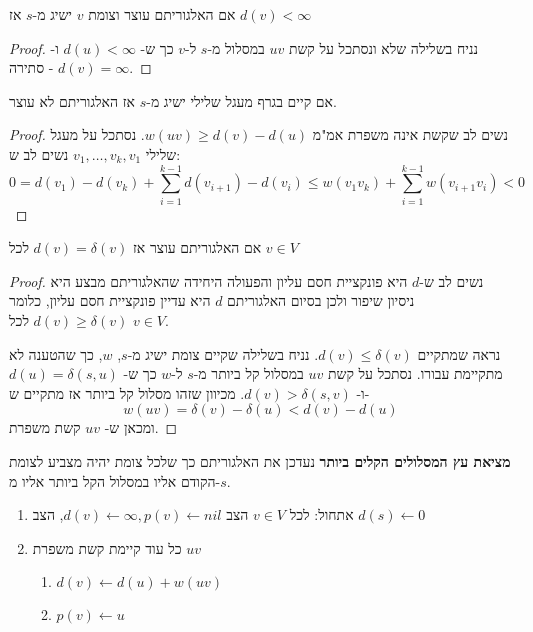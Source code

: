 \begin{claim}
אם האלגוריתם עוצר וצומת $v$ ישיג מ-$s$ אז 
$d(v) < \infty$
\end{claim}
\begin{proof}
נניח בשלילה שלא ונסתכל על קשת
$uv$
במסלול מ-$s$ ל-$v$ כך ש-%
$d(u) < \infty$
ו-%
$d(v) = \infty$
- סתירה.
\end{proof}



\begin{claim}
אם קיים בגרף מעגל שלילי ישיג מ-$s$ אז האלגוריתם לא עוצר.
\end{claim}
\begin{proof}
נשים לב שקשת אינה משפרת אמ"מ 
$w(uv) \geq d(v) - d(u)$.
נסתכל על מעגל שלילי
$v_1, \ldots, v_k, v_1$
נשים לב ש:
$$
0 = 
d(v_1) - d(v_k) + \sum_{i=1}^{k-1} d(v_{i + 1}) - d(v_{i})
\leq
w(v_1v_k) + \sum_{i=1}^{k-1} w(v_{i+1}v_i) < 0
$$
\end{proof}



\begin{claim}
אם האלגוריתם עוצר אז 
$d(v) = \delta(v)$
לכל
$v \in V$
\end{claim}
\begin{proof}
נשים לב ש-$d$ היא פונקציית חסם עליון והפעולה היחידה שהאלגוריתם מבצע היא ניסיון שיפור ולכן
בסיום האלגוריתם $d$ היא עדיין פונקציית חסם עליון, כלומר 
$d(v) \geq \delta(v)$
לכל
$v \in V$.

נראה שמתקיים 
$d(v) \leq \delta(v)$.
נניח בשלילה שקיים צומת ישיג מ-$s$,
$w$,
כך שהטענה לא מתקיימת עבורו.
נסתכל על קשת 
$uv$
במסלול קל ביותר מ-$s$ ל-$w$
כך ש-%
$d(u) = \delta(s,u)$
ו-%
$d(v) > \delta(s,v)$.
מכיוון שזהו מסלול קל ביותר אז מתקיים ש-%
$$w(uv) = \delta(v) - \delta(u) < d(v) - d(u)$$
ומכאן ש-%
$uv$
קשת משפרת.

\end{proof}

\textbf{מציאת עץ המסלולים הקלים ביותר}
נעדכן את האלגוריתם כך שלכל צומת יהיה מצביע לצומת הקודם אליו במסלול הקל ביותר אליו מ-$s$.

\begin{enumerate}
\item
אתחול:
לכל 
$v \in V$
הצב
$d(v) \leftarrow \infty, p(v) \leftarrow nil$,
הצב
$d(s) \leftarrow 0$
\item
כל עוד קיימת קשת משפרת 
$uv$
\begin{enumerate}
\item
$d(v) \leftarrow d(u) + w(uv)$
\item
$p(v) \leftarrow u$
\end{enumerate}
\end{enumerate}


